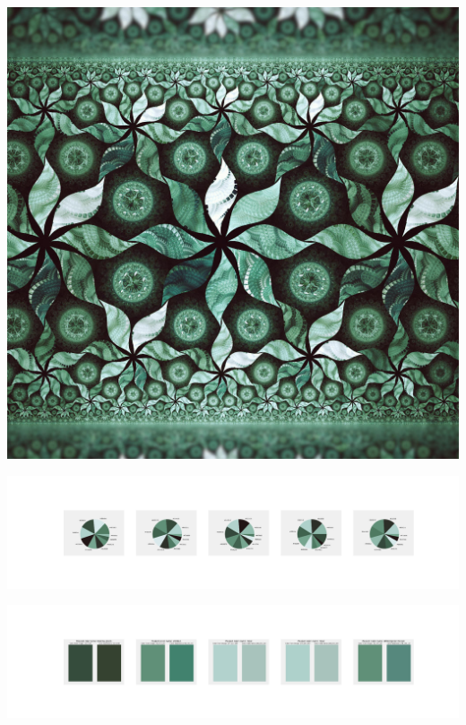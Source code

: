 \documentclass[11pt]{article}
\begin{document}
\begin{landscape}
    \begin{center}
    \includegraphics[width=\textwidth]{./nbimg/file (418).jpg}
    \end{center}

    \begin{center}
    \includegraphics[width=250mm]{./nbimg/pie-354.jpg}
    \end{center}

    \begin{center}
    \includegraphics[width=250mm]{./nbimg/peak-354.jpg}
    \end{center}
    


\end{landscape}
\end{document}
